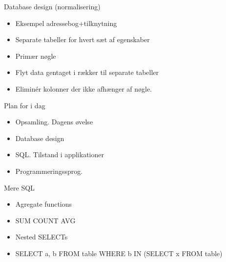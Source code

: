 \documentclass[a4paper,landscape]{slides}
\begin{document}
\begin{slide}
	\begin{center} {\large 
            Database design (normalisering)
	} \end{center}
	\begin{itemize} \addtolength{\itemsep}{-\baselineskip}
            \item Eksempel adressebog+tilknytning
            \item Separate tabeller for hvert sæt af egenskaber
            \item Primær nøgle
            \item Flyt data gentaget i rækker til separate tabeller
            \item Eliminér kolonner der ikke afhænger af nøgle.
	\end{itemize}
\end{slide}

\begin{slide}
	\begin{center} {\large 
            Plan for i dag
	} \end{center}
	\begin{itemize} \addtolength{\itemsep}{-\baselineskip}
		\item Opsamling. Dagens øvelse
                \item Database design
                \item SQL. Tilstand i applikationer
                \item Programmeringssprog. 
	\end{itemize}
\end{slide}

\begin{slide}
	\begin{center} {\large 
            Mere SQL
	} \end{center}
	\begin{itemize} \addtolength{\itemsep}{-\baselineskip}
            \item Agregate functions
            \item SUM COUNT AVG
            \item Nested SELECTs
            \item SELECT a, b FROM table WHERE b IN (SELECT x FROM table)
	\end{itemize}
\end{slide}
\end{document}
